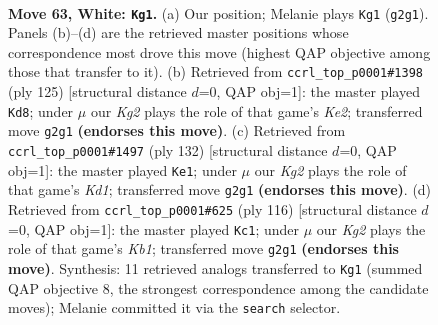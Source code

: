 \documentclass[11pt]{article}
\begin{document}
\clearpage

\begin{figure}[p]\centering
\begin{subfigure}{0.46\textwidth}\centering
\resizebox{\linewidth}{!}{%
\newchessgame
\chessboard[
  setfen={5k2/8/2r5/8/7R/8/6K1/8 w - - 6 63},
  showmover=false,
  pgfstyle=straightmove, color=movearrow, markmove={g2-g1}
]}
\caption{}
\end{subfigure}\hfill
\begin{subfigure}{0.46\textwidth}\centering
\resizebox{\linewidth}{!}{%
\newchessgame
\chessboard[
  setfen={8/4k3/7r/8/1R6/8/8/3K4 b - - 4 63},
  showmover=false,
  pgfstyle=straightmove, color=movearrow, markmove={e7-d8}
]}
\caption{}
\end{subfigure}
\\[4pt]
\begin{subfigure}{0.46\textwidth}\centering
\resizebox{\linewidth}{!}{%
\newchessgame
\chessboard[
  setfen={2R5/5r2/8/8/6k1/8/8/3K4 w - - 13 67},
  showmover=false,
  pgfstyle=straightmove, color=movearrow, markmove={d1-e1}
]}
\caption{}
\end{subfigure}\hfill
\begin{subfigure}{0.46\textwidth}\centering
\resizebox{\linewidth}{!}{%
\newchessgame
\chessboard[
  setfen={2k5/8/6r1/7R/8/8/8/1K6 w - - 18 59},
  showmover=false,
  pgfstyle=straightmove, color=movearrow, markmove={b1-c1}
]}
\caption{}
\end{subfigure}
\caption{\textbf{Move 63, White: \texttt{Kg1}.} (a) Our position; Melanie plays \texttt{Kg1} (\texttt{g2g1}). Panels (b)--(d) are the retrieved master positions whose correspondence most drove this move (highest QAP objective among those that transfer to it). (b) Retrieved from \texttt{ccrl\_top\_p0001\#1398} (ply 125) [structural distance $d$=0, QAP obj=1]: the master played \texttt{Kd8}; under $\mu$ our \emph{Kg2} plays the role of that game's \emph{Ke2}; transferred move \texttt{g2g1} \textbf{(endorses this move)}. (c) Retrieved from \texttt{ccrl\_top\_p0001\#1497} (ply 132) [structural distance $d$=0, QAP obj=1]: the master played \texttt{Ke1}; under $\mu$ our \emph{Kg2} plays the role of that game's \emph{Kd1}; transferred move \texttt{g2g1} \textbf{(endorses this move)}. (d) Retrieved from \texttt{ccrl\_top\_p0001\#625} (ply 116) [structural distance $d$=0, QAP obj=1]: the master played \texttt{Kc1}; under $\mu$ our \emph{Kg2} plays the role of that game's \emph{Kb1}; transferred move \texttt{g2g1} \textbf{(endorses this move)}. Synthesis: 11 retrieved analogs transferred to \texttt{Kg1} (summed QAP objective 8, the strongest correspondence among the candidate moves); Melanie committed it via the \texttt{search} selector.}
\label{fig:thought-m124}
\end{figure}
\end{document}
